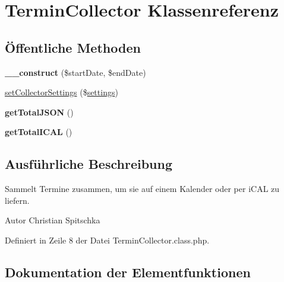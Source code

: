 \hypertarget{class_termin_collector}{}\section{Termin\+Collector Klassenreferenz}
\label{class_termin_collector}
\subsection*{Öffentliche Methoden}
\begin{DoxyCompactItemize}
\item 
\mbox{\label{class_termin_collector_ae7e5ed2ed831789aa91272203906761f}} 
{\bfseries \+\_\+\+\_\+construct} (\$start\+Date, \$end\+Date)
\item 
\mbox{\hyperlink{class_termin_collector_ac4c3c618b5e4c21cffbfa47a4f213780}{set\+Collector\+Settings}} (\$\mbox{\hyperlink{classsettings}{settings}})
\item 
\mbox{\label{class_termin_collector_a493735e84bc715d4600d3254cfe7734d}} 
{\bfseries get\+Total\+J\+S\+ON} ()
\item 
\mbox{\label{class_termin_collector_ae269d817acd7c83b8a56088dcb92faea}} 
{\bfseries get\+Total\+I\+C\+AL} ()
\end{DoxyCompactItemize}


\subsection{Ausführliche Beschreibung}
Sammelt Termine zusammen, um sie auf einem Kalender oder per i\+C\+AL zu liefern. \begin{DoxyAuthor}{Autor}
Christian Spitschka 
\end{DoxyAuthor}


Definiert in Zeile 8 der Datei Termin\+Collector.\+class.\+php.



\subsection{Dokumentation der Elementfunktionen}
\mbox{\label{class_termin_collector_ac4c3c618b5e4c21cffbfa47a4f213780}} 
